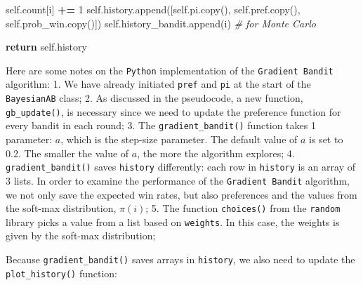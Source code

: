 \documentclass[
]{book}
\newenvironment{Shaded}{\begin{snugshade}}{\end{snugshade}}
\newcommand{\CommentTok}[1]{\textcolor[rgb]{0.56,0.35,0.01}{\textit{#1}}}
\newcommand{\ControlFlowTok}[1]{\textcolor[rgb]{0.13,0.29,0.53}{\textbf{#1}}}
\newcommand{\DecValTok}[1]{\textcolor[rgb]{0.00,0.00,0.81}{#1}}
\newcommand{\NormalTok}[1]{#1}
\newcommand{\OperatorTok}[1]{\textcolor[rgb]{0.81,0.36,0.00}{\textbf{#1}}}
\newcommand{\VariableTok}[1]{\textcolor[rgb]{0.00,0.00,0.00}{#1}}
\theoremstyle{definition}
\theoremstyle{definition}
\theoremstyle{definition}
\theoremstyle{definition}
\theoremstyle{remark}
\begin{document}
\begin{Shaded}
\begin{Highlighting}[]
            \VariableTok{self}\NormalTok{.count[i] }\OperatorTok{+=} \DecValTok{1}
            \VariableTok{self}\NormalTok{.history.append([}\VariableTok{self}\NormalTok{.pi.copy(),}
                                 \VariableTok{self}\NormalTok{.pref.copy(),}
                                 \VariableTok{self}\NormalTok{.prob\_win.copy()])}
            \VariableTok{self}\NormalTok{.history\_bandit.append(i)  }\CommentTok{\# for Monte Carlo}

        \ControlFlowTok{return} \VariableTok{self}\NormalTok{.history}
\end{Highlighting}
\end{Shaded}

Here are some notes on the \texttt{Python} implementation of the \texttt{Gradient\ Bandit} algorithm:
1. We have already initiated \texttt{pref} and \texttt{pi} at the start of the \texttt{BayesianAB} class;
2. As discussed in the pseudocode, a new function, \texttt{gb\_update()}, is necessary since we need to update the preference function for every bandit in each round;
3. The \texttt{gradient\_bandit()} function takes 1 parameter: \(a\), which is the step-size parameter. The default value of \(a\) is set to 0.2. The smaller the value of \(a\), the more the algorithm explores;
4. \texttt{gradient\_bandit()} saves \texttt{history} differently: each row in \texttt{history} is an array of 3 lists. In order to examine the performance of the \texttt{Gradient\ Bandit} algorithm, we not only save the expected win rates, but also preferences and the values from the soft-max distribution, \(\pi(i)\);
5. The function \texttt{choices()} from the \texttt{random} library picks a value from a list based on \texttt{weights}. In this case, the weights is given by the soft-max distribution;

Because \texttt{gradient\_bandit()} saves arrays in \texttt{history}, we also need to update the \texttt{plot\_history()} function:
\end{document}
